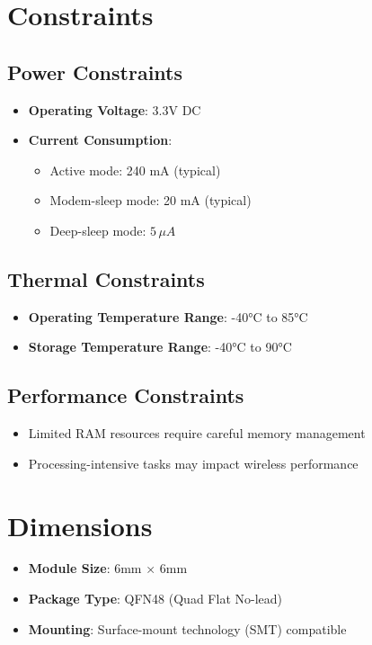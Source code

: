 \section{Constraints}

\subsection{Power Constraints}
\begin{itemize}
	\item \textbf{Operating Voltage}: 3.3V DC
	\item \textbf{Current Consumption}:
	\begin{itemize}
		\item Active mode: 240 mA (typical)
		\item Modem-sleep mode: 20 mA (typical)
		\item Deep-sleep mode: $5\,\mu A$
	\end{itemize}
\end{itemize}

\subsection{Thermal Constraints}
\begin{itemize}
	\item \textbf{Operating Temperature Range}: -40°C to 85°C
	\item \textbf{Storage Temperature Range}: -40°C to 90°C \cite{Espressif:2023}
\end{itemize}

\subsection{Performance Constraints}
\begin{itemize}
	\item Limited RAM resources require careful memory management
	\item Processing-intensive tasks may impact wireless performance
\end{itemize}

\section{Dimensions}

\begin{itemize}
	\item \textbf{Module Size}: 6mm × 6mm
	\item \textbf{Package Type}: QFN48 (Quad Flat No-lead)
	\item \textbf{Mounting}: Surface-mount technology (SMT) compatible
\end{itemize}

